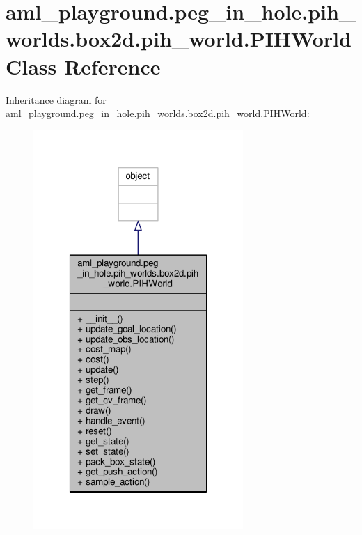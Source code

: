 \hypertarget{classaml__playground_1_1peg__in__hole_1_1pih__worlds_1_1box2d_1_1pih__world_1_1_p_i_h_world}{\section{aml\-\_\-playground.\-peg\-\_\-in\-\_\-hole.\-pih\-\_\-worlds.\-box2d.\-pih\-\_\-world.\-P\-I\-H\-World Class Reference}
\label{classaml__playground_1_1peg__in__hole_1_1pih__worlds_1_1box2d_1_1pih__world_1_1_p_i_h_world}
}


Inheritance diagram for aml\-\_\-playground.\-peg\-\_\-in\-\_\-hole.\-pih\-\_\-worlds.\-box2d.\-pih\-\_\-world.\-P\-I\-H\-World\-:\nopagebreak
\begin{figure}[H]
\begin{center}
\leavevmode
\includegraphics[width=226pt]{classaml__playground_1_1peg__in__hole_1_1pih__worlds_1_1box2d_1_1pih__world_1_1_p_i_h_world__inherit__graph}
\end{center}
\end{figure}


